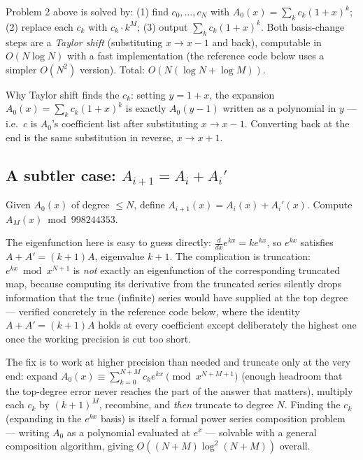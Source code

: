 \documentclass[11pt]{article}
\begin{document}
\begin{theorembox}
Problem 2 above is solved by: (1) find $c_0,\ldots,c_N$ with
$A_0(x) = \sum_k c_k(1+x)^k$; (2) replace each $c_k$ with $c_k \cdot
k^M$; (3) output $\sum_k c_k (1+x)^k$. Both basis-change steps are a
\emph{Taylor shift} (substituting $x \to x - 1$ and back), computable in
$O(N \log N)$ with a fast implementation (the reference code below uses
a simpler $O(N^2)$ version). Total: $O(N(\log N + \log M))$.
\end{theorembox}

\begin{notebox}
Why Taylor shift finds the $c_k$: setting $y = 1+x$, the expansion
$A_0(x) = \sum_k c_k(1+x)^k$ is exactly $A_0(y-1)$ written as a
polynomial in $y$ --- i.e.\ $c$ is $A_0$'s coefficient list after
substituting $x \to x-1$. Converting back at the end is the same
substitution in reverse, $x \to x+1$.
\end{notebox}

\subsection{A subtler case: \texorpdfstring{$A_{i+1}=A_i+A_i'$}{A\_{i+1}=A\_i+A\_i'}}
\begin{definitionbox}
Given $A_0(x)$ of degree $\le N$, define $A_{i+1}(x) = A_i(x) + A_i'(x)$.
Compute $A_M(x) \bmod 998244353$.
\end{definitionbox}

The eigenfunction here is easy to guess directly: $\frac{d}{dx}e^{kx} =
k e^{kx}$, so $e^{kx}$ satisfies $A + A' = (k+1)A$, eigenvalue $k+1$. The
complication is truncation: $e^{kx} \bmod x^{N+1}$ is \emph{not} exactly
an eigenfunction of the corresponding truncated map, because computing
its derivative from the truncated series silently drops information that
the true (infinite) series would have supplied at the top degree ---
verified concretely in the reference code below, where the identity
$A+A' = (k+1)A$ holds at every coefficient except deliberately the
highest one once the working precision is cut too short.

The fix is to work at higher precision than needed and truncate only at
the very end: expand $A_0(x) \equiv \sum_{k=0}^{N+M} c_k e^{kx}
\pmod{x^{N+M+1}}$ (enough headroom that the top-degree error never
reaches the part of the answer that matters), multiply each $c_k$ by
$(k+1)^M$, recombine, and \emph{then} truncate to degree $N$. Finding the
$c_k$ (expanding in the $e^{kx}$ basis) is itself a formal power series
composition problem --- writing $A_0$ as a polynomial evaluated at
$e^x$ --- solvable with a general composition algorithm, giving
$O((N+M)\log^2(N+M))$ overall.
\end{document}
